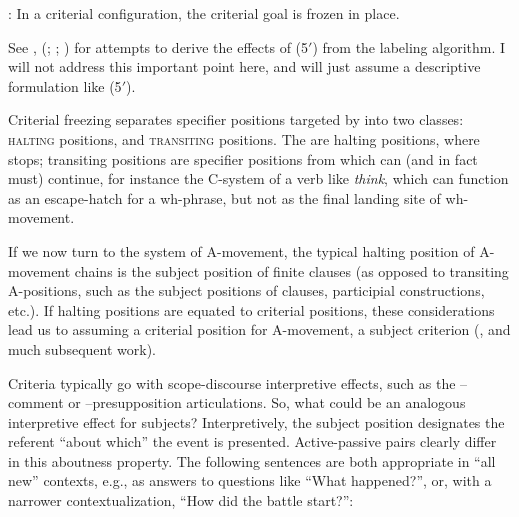 \documentclass[output=paper]{langsci/langscibook}
\begin{document}
\begin{exe}
     : In a criterial configuration, the criterial
    goal is frozen in place.\label{ex:21.5prime}
\z

See \textcite{Chomsky2013,Chomsky2015}, \citeauthor{Rizzi2015}
(\citeyear{Rizzi2015}; \citeyear{Rizzi2015b}; \citeyear{Rizzi2016a}) for
attempts to derive the effects of (5$'$) from the labeling algorithm. I will not
address this important point here, and will just assume a descriptive
formulation like (5$'$).

Criterial freezing separates specifier positions
targeted by  into two classes: \textsc{halting} positions, and
\textsc{transiting} positions. The  are halting
positions, where  stops; transiting positions are specifier positions
from which  can (and in fact must) continue, for instance the C-system
of a verb like \emph{think}, which can function as an escape-hatch for a
wh-phrase, but not as the final landing site of wh-movement.

If we now turn to the system of A-movement, the typical halting position of
A-movement chains is the subject position of finite clauses (as opposed to
transiting A-positions, such as the subject positions of  clauses,
participial constructions, etc.). If halting positions are equated to criterial
positions, these considerations lead us to assuming a criterial position for
A-movement, a subject criterion (\citealt{rizzicriterial}, and much subsequent
work).

Criteria typically go with scope-discourse interpretive effects, such as the\linebreak
{}--comment or --presupposition articulations. So, what could be an
analogous interpretive effect for subjects? Interpretively, the subject
position designates the referent “about which” the event is presented.
Active-passive pairs clearly differ in this aboutness property. The following
sentences are both appropriate in “all new” contexts, e.g., as answers to
questions like “What happened?”, or, with a narrower contextualization, “How
did the battle start?”:\pagebreak


\end{exe}
\end{document}
